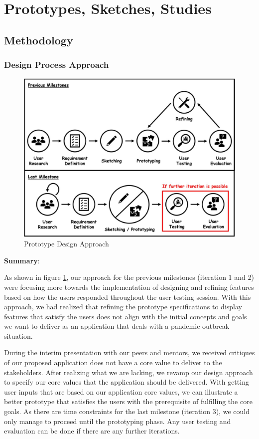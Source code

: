 \section{Prototypes, Sketches, Studies}

  \subsection{Methodology}
  
    \subsubsection{Design Process Approach}
      \begin{figure}[H]
        \centering
        \includegraphics[width=\textwidth]{img/prototype/prototype-1.JPG}
        \caption{Prototype Design Approach}
        \label{fig:design-approach}
      \end{figure}
      \par \textbf{Summary}:
      \par As shown in figure \ref{fig:design-approach}, our approach for the previous milestones (iteration 1 and 2) were focusing
      more towards the implementation of designing and refining features based on how the users
      responded throughout the user testing session. With this approach, we had realized that refining the
      prototype specifications to display features that satisfy the users does not align with the initial
      concepts and goals we want to deliver as an application that deals with a pandemic outbreak situation.
      \par During the interim presentation with our peers and mentors, we received critiques of our proposed
      application does not have a core value to deliver to the stakeholders. After realizing what we are
      lacking, we revamp our design approach to specify our core values that the application should be
      delivered. With getting user inputs that are based on our application core values, we can illustrate a
      better prototype that satisfies the users with the prerequisite of fulfilling the core goals. As there are
      time constraints for the last milestone (iteration 3), we could only manage to proceed until the
      prototyping phase. Any user testing and evaluation can be done if there are any further iterations.

